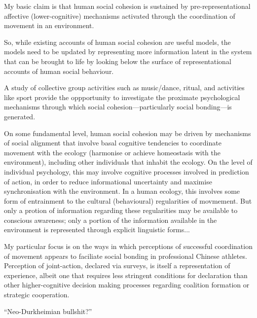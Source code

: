 \documentclass[12pt]{report}
\begin{document}






My basic claim is that human social cohesion is sustained by pre-representational affective (lower-cognitive) mechanisms activated through the coordination of movement in an environment.

So, while existing accounts of human social cohesion are useful models, the models need to be updated by representing more information latent in the system that can be brought to life by looking below the surface of representational accounts of human social behaviour.

A study of collective group activities such as music/dance, ritual, and activities like sport provide the oppportunity to investigate the proximate psychological mechanisms through which social cohesion—particularly social bonding—is generated.

On some fundamental level, human social cohesion may be driven by mechanisms of social alignment that involve basal cognitive tendencies to coordinate movement with the ecology (harmonise or achieve homeostasis with the environment), including other individuals that inhabit the ecology.  On the level of individual psychology, this may involve cognitive processes involved in prediction of action, in order to reduce informational uncertainty and maximise synchronisation with the environment.   In a human ecology, this involves some form of entrainment to the cultural (behavioural) regularities of movmement.  But only a protion of information regarding these regularities may be available to conscious awareness; only a portion of the information available in the environment is represented through explicit linguistic forms...

My particular focus is on the ways in which perceptions of successful coordination of movement appears to faciliate social bonding in professional Chinese athletes. Perception of joint-action, declared via surveys, is itself a representation of experience, albeit one that requires less stringent conditions for declaration than other higher-cognitive decision making processes regarding coalition formation or strategic cooperation.

``Neo-Durkheimian bullshit?''
\end{document}
